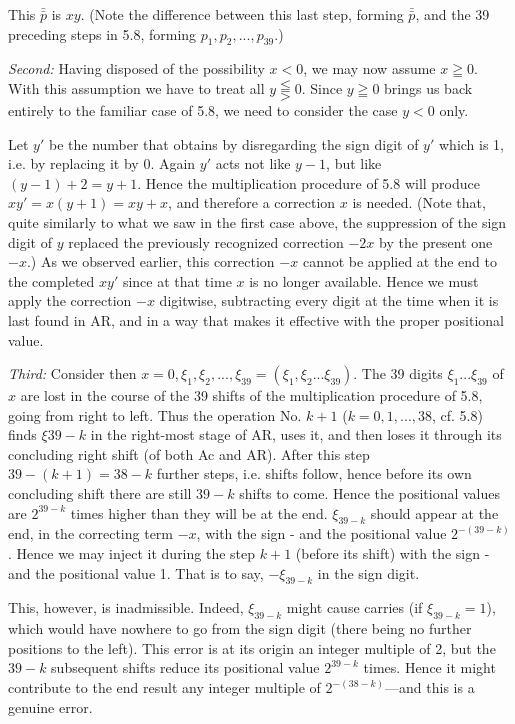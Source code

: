 \documentclass[12pt]{amsart}
\begin{document}
This $\bar{\bar{p}}$ is $xy$. (Note the difference between this last step, forming $\bar{\bar{p}}$, and the 39 preceding steps in 5.8, forming $p_1, p_2 , ... , p_{39}$.)

\emph{Second:} Having disposed of the possibility $x < 0$, we may now assume $x \geqq 0$. With this assumption we have to treat all $y \lesseqqgtr 0$. Since $y \geqq 0$ brings us back entirely to the familiar case of 5.8, we need to consider the case $y < 0$ only.

Let $y'$ be the number that obtains by disregarding the sign digit of $y'$ which is 1, i.e. by replacing it by 0. Again $y'$ acts not like $y - 1$, but like $(y - 1) + 2 = y + 1$. Hence the multiplication procedure of 5.8 will produce $xy' = x(y + 1) = xy + x$, and therefore a correction $x$ is needed. (Note that, quite similarly to what we saw in the first case above, the suppression of the sign digit of $y$ replaced the previously recognized correction $-2x$ by the present one $-x$.) As we observed earlier, this correction $-x$ cannot be applied at the end to the completed $xy'$ since at that time $x$ is no longer available. Hence we must apply the correction $-x$ digitwise, subtracting every digit at the time when it is last found in AR, and in a way that makes it effective with the proper positional value.

\emph{Third:} Consider then $x = 0, \xi_1, \xi_2, ... , \xi_{39} = (\xi_1, \xi_2 ... \xi_{39})$. The 39 digits $\xi_1 ... \xi_{39}$ of $x$ are lost in the course of the 39 shifts of the multiplication procedure of 5.8, going from right to left. Thus the operation No. $k + 1$ ($k = 0, 1, ..., 38$, cf. 5.8) finds $\xi{39 - k}$ in the right-most stage of AR, uses it, and then loses it through its concluding right shift (of both Ac and AR). After this step $39 - (k + 1) = 38 - k$ further steps, i.e. shifts follow, hence before its own concluding shift there are still $39 - k$ shifts to come. Hence the positional values are $2^{39 - k}$ times higher than they will be at the end. $\xi_{39 - k}$ should appear at the end, in the correcting term $-x$, with the sign - and the positional value $2^{-(39 - k)}$ . Hence we may inject it during the step $k + 1$ (before its shift) with the sign - and the positional value 1. That is to say, $-\xi_{39 - k}$ in the sign digit.

This, however, is inadmissible. Indeed, $\xi_{39 - k}$ might cause carries (if $\xi_{39 - k} = 1$), which would have nowhere to go from the sign digit (there being no further positions to the left). This error is at its origin an integer multiple of 2, but the $39 - k$ subsequent shifts reduce its positional value $2^{39 - k}$ times. Hence it might contribute to the end result any integer multiple of $2^{-(38 - k)}$---and this is a genuine error.
\end{document}
